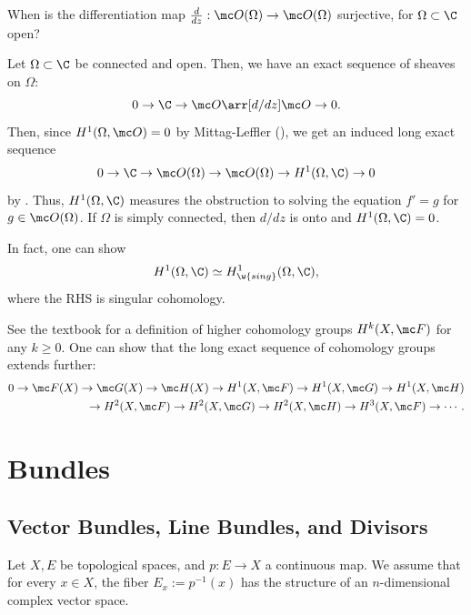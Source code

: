 \documentclass[11pt]{report}
\begin{document}
\begin{que}
When is the differentiation map $\frac{d}{dz}:\mc O(\Omega) \to \mc O(\Omega)$ surjective, for $\Omega \subset \C$ open?
\end{que}

\begin{ex}
    Let $\Omega \subset \C$ be connected and open. Then, we have an exact sequence of sheaves on $\Omega$:
    \[
    0 \to \C \to \mc O \arr[d/dz] \mc O \to 0.
    \]
Then, since $H^1(\Omega,\mc O)=0$ by Mittag-Leffler (), we get an induced long exact sequence
\[
0 \to \C \to \mc O(\Omega)\to \mc O(\Omega) \to H^1(\Omega,\C)\to 0
\]
by . Thus, $H^1(\Omega,\C)$ measures the obstruction to solving the equation $f'=g$ for $g \in \mc O(\Omega)$. If $\Omega$ is simply connected, then $d/dz$ is onto and $H^1(\Omega, \C)=0$. 

In fact, one can show
\[
H^1(\Omega,\C) \simeq H^1_{\w{sing}}(\Omega,\C),
\]
where the RHS is singular cohomology.
\end{ex}

\begin{rmk}
    See the textbook for a definition of higher cohomology groups $H^k(X,\mc F)$ for any $k \geq 0$. One can show that the long exact sequence of cohomology groups extends further:
\begin{align*}
    0 \to \mc F(X) \to \mc G(X) \to \mc H(X) \to H^1(X, \mc F) \to H^1 (X,\mc G) \to H^1(X, \mc H)
    \\ \to H^2(X,\mc F) \to H^2(X,\mc G) \to H^2(X,\mc H) \to H^3(X,\mc F)\to \cdots.
\end{align*}
\end{rmk}

\chapter{Bundles}

\section{Vector Bundles, Line Bundles, and Divisors}

Let $X, E$ be topological spaces, and $p:E \to X$ a continuous map. We assume that for every $x \in X$, the fiber $E_x:=p^{-1}(x)$ has the structure of an $n$-dimensional complex vector space.
\end{document}
